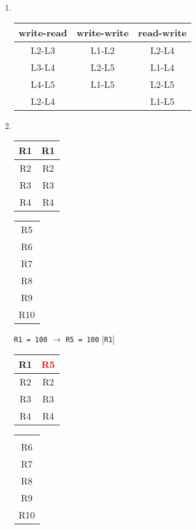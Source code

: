 \documentclass[12pt]{article}
\begin{document}
	\begin{enumerate}
		\item ~
			\begin{table}[H]
				\centering
				\begin{tabular}{|c|c|c|}
					\hline
					write-read & write-write & read-write\\
					\hline
					L2-L3 & L1-L2 & L2-L4\\
					L3-L4 & L2-L5 & L1-L4\\
					L4-L5 & L1-L5 & L2-L5\\
					L2-L4 &  & L1-L5\\
					\hline
				\end{tabular}
			\end{table}
		\item ~
			\begin{table}[H]
				\centering
				\begin{tabular}{|c|c|}
					\hline R1 & R1\\ \hline R2 & R2\\ \hline R3 & R3\\ \hline R4 & R4\\ \hline
				\end{tabular}
				\hspace{5em}
				\begin{tabular}{|c|}
					\hline R5\\ R6\\ R7\\ R8\\ R9\\ R10\\ \hline
				\end{tabular}
			\end{table}
			\centerline{\texttt{R1 = 100} $\rightarrow$ \texttt{R5 = 100} [\texttt{R1}]}
			\begin{table}[H]
				\centering
				\begin{tabular}{|c|c|}
					\hline R1 & \textcolor{red}{R5}\\ \hline R2 & R2\\ \hline R3 & R3\\ \hline R4 & R4\\ \hline
				\end{tabular}
				\hspace{5em}
				\begin{tabular}{|c|}
					\hline \\ R6\\ R7\\ R8\\ R9\\ R10\\ \hline

\end{tabular}
\end{table}
\end{enumerate}
\end{document}
